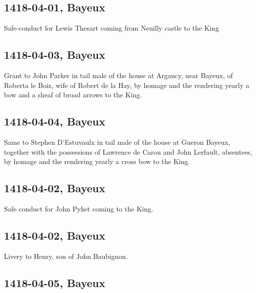 \documentclass[a4paper,12pt,twoside]{book}
\begin{document}
            \subsection{1418-04-01, Bayeux}
            
                  Safe-conduct for Lewis Thesart coming from Neuilly castle to the King
               
            \subsection{1418-04-03, Bayeux}
            
                  Grant to John Parker in tail male of the house at Argancy, near Bayeux, of Roberta le Boiz, wife of Robert de la Hay, by homage and the rendering yearly a bow and a sheaf of broad arrows to the King.
               
            \subsection{1418-04-04, Bayeux}
            
                  Same to Stephen D’Estuvaulx in tail male of the house at Gueron Bayeux, together with the possessions of Lawrence de Carou and John Lerfault, absentees, by homage and the rendering yearly a cross bow to the King.
               
            \subsection{1418-04-02, Bayeux}
            
                  Safe conduct for John Pyket coming to the King.
               
            \subsection{1418-04-02, Bayeux}
            
                  Livery to Henry, son of John Baubignon.
               
            \subsection{1418-04-05, Bayeux}
            
\end{document}
